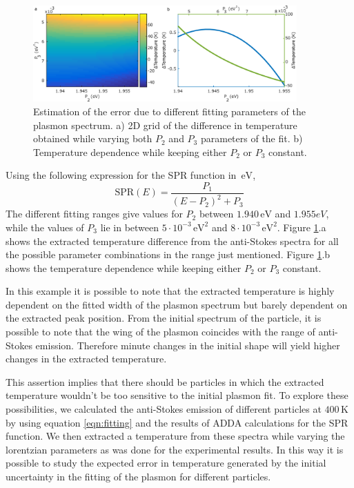 \documentclass[journal=nalefd,manuscript=letter]{achemso}
\newcommand{\K}{\ensuremath{\,\textrm{K}}}
\newcommand{\eV}{\ensuremath{\,\textrm{eV}}}
\begin{document}
\begin{figure}[htp] \centering
\includegraphics[width=0.90\textwidth]{Figures/05_Estimation_error/05_estimation_error.png}
\caption{Estimation of the error due to different fitting parameters of the
plasmon spectrum. a) 2D grid of the difference in temperature obtained while
varying both $P_2$ and $P_3$ parameters of the fit. b) Temperature dependence
while keeping either $P_2$ or $P_3$ constant.}
	\label{fig:estimation-error}
\end{figure}

Using the following expression for the SPR function in $\eV$, 
\begin{equation*}
\textrm{SPR}(E) = \frac{P_1}{(E-P_2)^2+P_3}
\end{equation*}
The different fitting ranges give values for $P_2$ between $1.940\eV$ and
$1.955eV$, while the values of $P_3$ lie in between $5\cdot10^{-3}\eV^2$ and
$8\cdot10^{-3}\eV^2$. Figure \ref{fig:estimation-error}.a shows the extracted
temperature difference from the anti-Stokes spectra for all the possible
parameter combinations in the range just mentioned. Figure \ref{fig:estimation-error}.b
shows the temperature dependence while keeping either $P_2$ or $P_3$ constant.

In this example it is possible to note that the extracted temperature is highly
dependent on the fitted width of the plasmon spectrum but barely dependent on
the extracted peak position. From the initial spectrum of the particle, it is
possible to note that the wing of the plasmon coincides with the range of
anti-Stokes emission. Therefore minute changes in the initial shape will yield
higher changes in the extracted temperature.

This assertion implies that there should be particles in which the extracted
temperature wouldn't be too sensitive to the initial plasmon fit. To explore
these possibilities, we calculated the anti-Stokes emission of different
particles at $400\K$ by using equation \ref{eqn:fitting} and the results of ADDA
calculations for the SPR function. We then extracted a temperature from these
spectra while varying the lorentzian parameters as was done for the experimental
results. In this way it is possible to study the expected error in temperature
generated by the initial uncertainty in the fitting of the plasmon for different
particles. 
\end{document}
